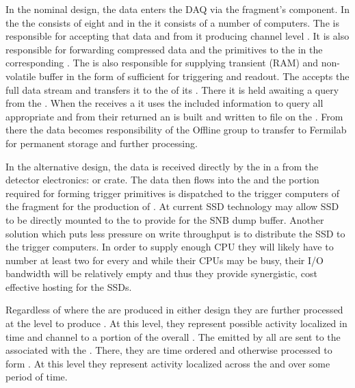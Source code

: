 In the nominal design, the data enters the DAQ via the fragment's
 component.
In the  the  consists of eight 
and in the  it consists of a number of computers.  
The  is responsible for accepting that data and from it
producing channel level .
It is also responsible for forwarding compressed data and the
primitives to the  in the corresponding .
The  is also responsible for supplying transient (RAM)
and non-volatile buffer in the form of  sufficient for
 triggering and readout.
The  accepts the full data stream and transfers it to the
 of its . 
There it is held awaiting a query from the . 
When the  receives a  it uses the
included information to query all appropriate  and from
their returned  an  is built and
written to file on the . 
From there the data becomes responsibility of the Offline group to
transfer to Fermilab for permanent storage and further processing.

In the alternative design, the data is received directly by the
 in a  from the detector electronics:
  or   crate. 
The data then flows into the  and the portion required
for forming trigger primitives is dispatched to the trigger computers
of the fragment for the production of .
At current SSD technology may allow SSD to be directly mounted to the
 to provide for the SNB dump buffer. 
Another solution which puts less pressure on write throughput is to
distribute the SSD to the trigger computers. 
In order to supply enough CPU they will likely have to number at least
two for every  and while their CPUs may be busy, their I/O
bandwidth will be relatively empty and thus they provide synergistic,
cost effective hosting for the SSDs.

Regardless of where the  are produced in either
design they are further processed at the  level to
produce . 
At this level, they represent possible activity localized in time and
channel to a portion of the overall .
The  emitted by all  are sent to
the  associated with the . 
There, they are time ordered and otherwise processed to form
.
At this level they represent activity localized across the
 and over some period of time.

